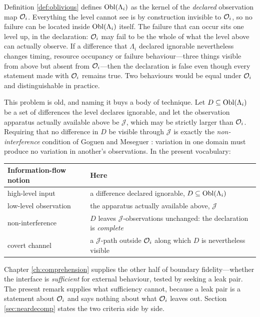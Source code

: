 \begin{remark}\label{rmk:noninterference}
Definition \ref{def:oblivious} defines $\operatorname{Obl}(\Lambda_i)$ as the kernel of the \emph{declared}
observation map $\mathcal{O}_i$. Everything the level cannot see is by construction invisible to
$\mathcal{O}_i$, so no failure can be located inside $\operatorname{Obl}(\Lambda_i)$ itself. The failure that can occur
sits one level up, in the declaration: $\mathcal{O}_i$ may fail to be the whole of what the level above
can actually observe. If a difference that $\Lambda_i$ declared ignorable nevertheless changes
timing, resource occupancy or failure behaviour---three things visible from above but absent from
$\mathcal{O}_i$---then the declaration is false even though every statement made with $\mathcal{O}_i$ remains
true. Two behaviours would be equal under $\mathcal{O}_i$ and distinguishable in practice.

This problem is old, and naming it buys a body of technique. Let $D \subseteq \operatorname{Obl}(\Lambda_i)$ be a
set of differences the level declares ignorable, and let the observation apparatus actually
available above be $\mathcal{J}$, which may be strictly larger than $\mathcal{O}_i$. Requiring that no
difference in $D$ be visible through $\mathcal{J}$ is exactly the \emph{non-interference} condition
of Goguen and Meseguer \cite{goguen1982}: variation in one domain must produce no variation in
another's observations. In the present vocabulary:

\begin{center}
\small
\begin{tabular}{L{4.2cm}L{10.0cm}}
\toprule
\textbf{Information-flow notion} & \textbf{Here} \\
\midrule
high-level input & a difference declared ignorable, $D \subseteq \operatorname{Obl}(\Lambda_i)$ \\
low-level observation & the apparatus actually available above, $\mathcal{J}$ \\
non-interference & $D$ leaves $\mathcal{J}$-observations unchanged: the declaration is \emph{complete} \\
covert channel & a $\mathcal{J}$-path outside $\mathcal{O}_i$ along which $D$ is nevertheless visible \\
\bottomrule
\end{tabular}
\end{center}

Chapter \ref{ch:comprehension} supplies the other half of boundary fidelity---whether the interface
is \emph{sufficient} for external behaviour, tested by seeking a leak pair. The present remark
supplies what sufficiency cannot, because a leak pair is a statement about $\mathcal{O}_i$ and says nothing
about what $\mathcal{O}_i$ leaves out. Section \ref{sec:neardecomp} states the two criteria side by side.


\end{remark}

